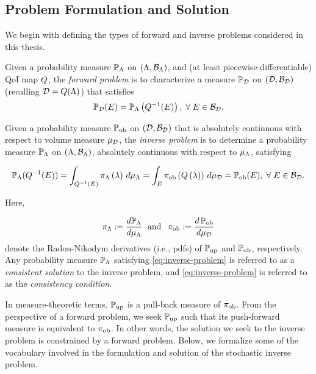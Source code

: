 \subsection{Problem Formulation and Solution}

We begin with defining the types of forward and inverse problems considered in this thesis.

\begin{defn}\label{defn:forward-problem}
  Given a probability measure $\mathbb{P}_{\Lambda}$ on $({\Lambda}, \mathcal{B}_{{\Lambda}})$, and (at least piecewise-differentiable) QoI map $Q$, the \emph{forward problem} is to characterize a measure $\mathbb{P}_{\mathcal{D}}$ on $(\mathcal{D}, \mathcal{B}_{\mathcal{D}})$ (recalling $\mathcal{D} = Q({\Lambda})$) that satisfies
  \begin{equation}\label{eq:forward-problem}
    \mathbb{P}_{\mathcal{D}} (E) = \mathbb{P}_{\Lambda} \left ( Q^{-1}(E) \right ), \; \forall \; E \in \mathcal{B}_{\mathcal{D}}.
  \end{equation}
\end{defn}

\begin{defn}\label{defn:inverse-problem}
  Given a probability measure $\operatorname*{\mathbb{P}_{ob}}$ on $(\mathcal{D}, \mathcal{B}_{\mathcal{D}})$ that is absolutely continuous with respect to volume measure $\mu_{\mathcal{D}}$, the \emph{inverse problem} is to determine a probability measure $\mathbb{P}_{\Lambda}$ on $({\Lambda}, \mathcal{B}_{{\Lambda}})$, absolutely continuous with respect to $\mu_{{\Lambda}}$, satisfying

  \begin{equation}\label{eq:inverse-problem}
    \mathbb{P}_{\Lambda} (Q^{-1}(E)) = \int_{Q^{-1}(E)} \pi_{\Lambda} \left ( \lambda \right ) \, d\mu_{{\Lambda}} = \int_E \operatorname*{\pi_{ob}} \left ( Q\left ( \lambda \right ) \right ) \, d\mu_{\mathcal{D}} = \operatorname*{\mathbb{P}_{ob}}(E), \; \forall \; E \in \mathcal{B}_{\mathcal{D}}.
  \end{equation} 

  \noindent Here,
   
  \begin{equation*}
    \pi_{\Lambda} := \frac{d\mathbb{P}_{\Lambda}}{d\mu_{{\Lambda}}} \;\text{ and }\; \operatorname*{\pi_{ob}} := \frac{d\operatorname*{\mathbb{P}_{ob}}}{d\mu_{\mathcal{D}}}
  \end{equation*}
  denote the Radon-Nikodym derivatives (i.e., pdfs) of $\operatorname*{\mathbb{P}_{up}}$ and $\operatorname*{\mathbb{P}_{ob}}$, respectively. 
  Any probability measure $\mathbb{P}_{\Lambda}$ satisfying \eqref{eq:inverse-problem} is referred to as a \emph{consistent solution} to the inverse problem, and \eqref{eq:inverse-problem} is referred to as the \emph{consistency condition}.
\end{defn}

In measure-theoretic terms, $\operatorname*{\mathbb{P}_{up}}$ is a pull-back measure of $\operatorname*{\pi_{ob}}$.
From the perspective of a forward problem, we seek $\operatorname*{\mathbb{P}_{up}}$ such that its push-forward measure is equivalent to $\operatorname*{\pi_{ob}}$. 
In other words, the solution we seek to the inverse problem is constrained by a forward problem. 
Below, we formalize some of the vocabulary involved in the formulation and solution of the stochastic inverse problem.

